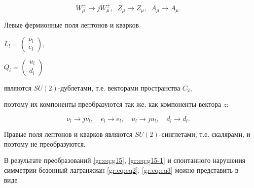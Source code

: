 \begin{equation}

W_{\mu}^{\pm} \rightarrow jW_{\mu}^{\pm}, \;\; Z_{\mu} \rightarrow Z_{\mu},\; \;A_{\mu} \rightarrow A_{\mu}.

\label{gr:eq:g15}

\end{equation}

Левые фермионные поля лептонов и кварков

$

L_l= \left(

\begin{array}{c}

	\nu_l\\

	e_{l}

\end{array} \right),\;

$

$

Q_l= \left(

\begin{array}{c}

	u_l\\

	d_{l}

\end{array} \right)

$

являются $SU(2)$-дублетами, т.е. векторами пространства $C_2$,

поэтому их компоненты преобразуются так же, как компоненты вектора $z$:

\begin{equation}

 	\nu_l \rightarrow j\nu_l, \quad e_{l} \rightarrow e_{l}, \quad

 	u_l \rightarrow ju_l, \quad d_{l} \rightarrow d_{l}.

\label{gr:eq:g15-1}

\end{equation}

Правые поля лептонов и кварков являются $SU(2)$-синглетами, т.е. скалярами, и поэтому не преобразуются.



В результате преобразований \eqref{gr:eq:g15}, \eqref{gr:eq:g15-1} и спонтанного нарушения симметрии бозонный лагранжиан \eqref{gr:eq:eq2}, \eqref{gr:eq:eq3} можно представить в виде \cite{gromov:Gr-2010}%


